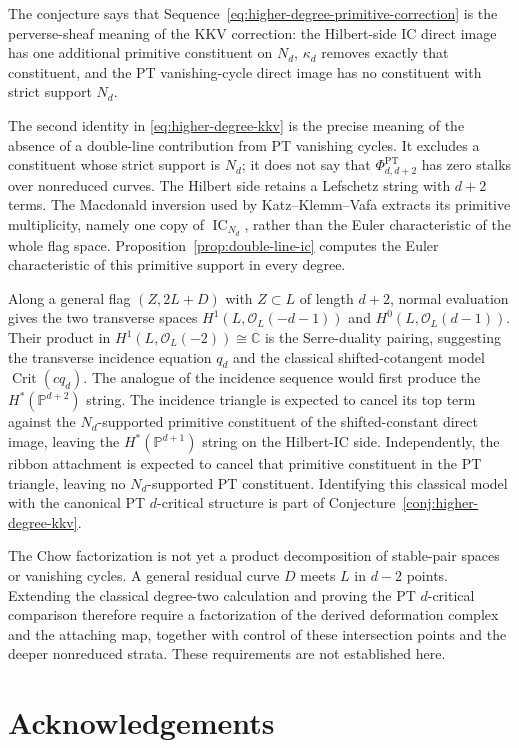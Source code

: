 \documentclass[11pt,reqno]{amsart}
\theoremstyle{definition}
\newcommand{\C}{\mathbb C}
\newcommand{\Pp}{\mathbb P}
\newcommand{\Ocal}{\mathcal O}
\newcommand{\IC}{\operatorname{IC}}
\newcommand{\PT}{\operatorname{PT}}
\begin{document}
The conjecture says that
Sequence~\eqref{eq:higher-degree-primitive-correction} is the
perverse-sheaf meaning of the KKV correction: the Hilbert-side IC direct
image has one additional primitive constituent on $N_d$, $\kappa_d$
removes exactly that constituent, and the PT vanishing-cycle direct image
has no constituent with strict support $N_d$.

The second identity in \eqref{eq:higher-degree-kkv} is the precise meaning
of the absence of a double-line contribution from PT vanishing cycles.  It
excludes a constituent whose strict support is $N_d$; it does not say that
$\Phi_{d,d+2}^{\PT}$ has zero stalks over nonreduced curves.  The Hilbert
side retains a Lefschetz string with $d+2$ terms.  The Macdonald inversion
used by Katz--Klemm--Vafa extracts its primitive multiplicity, namely one
copy of $\IC_{N_d}$, rather than the Euler characteristic of the whole flag
space.  Proposition~\ref{prop:double-line-ic} computes the Euler
characteristic of this primitive support in every degree.

Along a general flag $(Z,2L+D)$ with $Z\subset L$ of length $d+2$, normal
evaluation gives the two transverse spaces
$H^1(L,\Ocal_L(-d-1))$ and $H^0(L,\Ocal_L(d-1))$.
Their product in $H^1(L,\Ocal_L(-2))\cong\C$ is the Serre-duality pairing,
suggesting the transverse incidence equation $q_d$ and the classical shifted-cotangent model
$\operatorname{Crit}(cq_d)$.
The analogue of the incidence sequence would first produce the
$H^*(\Pp^{d+2})$ string.  The incidence triangle is expected to cancel its
top term against the $N_d$-supported primitive constituent of the
shifted-constant direct image, leaving the $H^*(\Pp^{d+1})$ string on the
Hilbert-IC side.  Independently, the ribbon attachment is expected to
cancel that primitive constituent in the PT triangle, leaving no
$N_d$-supported PT constituent.
Identifying this classical model with the canonical PT $d$-critical
structure is part of Conjecture~\ref{conj:higher-degree-kkv}.

The Chow factorization is not yet a product decomposition of stable-pair
spaces or vanishing cycles.  A general residual curve $D$ meets $L$ in
$d-2$ points.  Extending the classical degree-two calculation and proving
the PT $d$-critical comparison therefore require a factorization of the
derived deformation complex and the attaching map, together with control
of these intersection points and the deeper nonreduced strata.  These
requirements are not established here.


\section*{Acknowledgements}
\enlargethispage{3\baselineskip}
\end{document}
